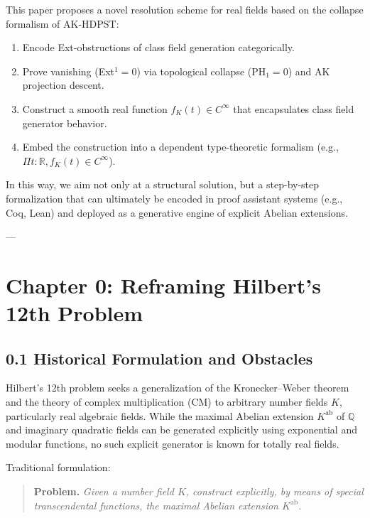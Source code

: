 \documentclass[11pt]{article}
\begin{document}
This paper proposes a novel resolution scheme for real fields based on the collapse formalism of AK-HDPST:
\begin{enumerate}[label=\textbf{(\arabic*)}]
    \item Encode Ext-obstructions of class field generation categorically.
    \item Prove vanishing (Ext\(^1 = 0\)) via topological collapse (PH\(_1 = 0\)) and AK projection descent.
    \item Construct a smooth real function \( f_K(t) \in C^\infty \) that encapsulates class field generator behavior.
    \item Embed the construction into a dependent type-theoretic formalism (e.g., \( \Pi t:\mathbb{R}, f_K(t)\in C^\infty \)).
\end{enumerate}

In this way, we aim not only at a structural solution, but a step-by-step formalization that can ultimately be encoded in proof assistant systems (e.g., Coq, Lean) and deployed as a generative engine of explicit Abelian extensions.


---


\section*{Chapter 0: Reframing Hilbert’s 12th Problem}

\subsection*{0.1 Historical Formulation and Obstacles}

Hilbert’s 12th problem seeks a generalization of the Kronecker–Weber theorem and the theory of complex multiplication (CM) to arbitrary number fields \( K \), particularly real algebraic fields. While the maximal Abelian extension \( K^{\mathrm{ab}} \) of \( \mathbb{Q} \) and imaginary quadratic fields can be generated explicitly using exponential and modular functions, no such explicit generator is known for totally real fields.

Traditional formulation:
\begin{quote}
\textbf{Problem.} \emph{Given a number field \( K \), construct explicitly, by means of special transcendental functions, the maximal Abelian extension \( K^{\mathrm{ab}} \).}
\end{quote}
\end{document}
